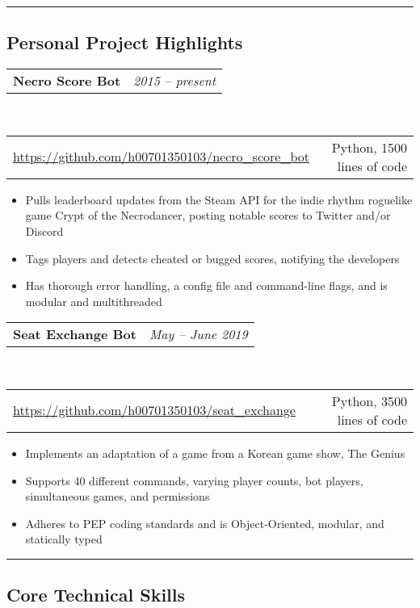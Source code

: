 \documentclass[10pt,letterpaper]{article}
\makeatletter
\newcommand{\headerrow}[2]
{\begin{tabular*}{\linewidth}{l@{\extracolsep{\fill}}r}
	#1 &
	#2 \\
\end{tabular*}}
\makeatother
\begin{document}
\hrule
\vspace{-0.4em}
\subsection*{Personal Project Highlights}


\headerrow
    {\textbf{Necro Score Bot}}
    {\emph{2015 -- present}}
\\
\headerrow
    {\url{https://github.com/h00701350103/necro\_score\_bot}}
    {Python, 1500 lines of code}
\begin{itemize}[noitemsep, topsep=0pt]
    \item Pulls leaderboard updates from the Steam API for the indie rhythm
        roguelike game Crypt of the Necrodancer, posting notable scores to
        Twitter and/or Discord
    \item Tags players and detects cheated or bugged scores, notifying the
        developers
    \item Has thorough error handling, a config file and command-line
        flags, and is modular and multithreaded
\end{itemize}

\vspace{0.5em}
\headerrow
    {\textbf{Seat Exchange Bot}}
    {\emph{May -- June 2019}}
\\
\headerrow
    {\url{https://github.com/h00701350103/seat\_exchange}}
    {Python, 3500 lines of code}
\begin{itemize}[noitemsep, topsep=0pt]
    \item Implements an adaptation of a game from a Korean game show, The
        Genius
    \item Supports 40 different commands, varying player counts,
        bot players, simultaneous games, and permissions
    \item Adheres to PEP coding standards and is Object-Oriented, modular,
        and statically typed
\end{itemize}



\vspace{0.5em}
\hrule
\vspace{-0.4em}
\subsection*{Core Technical Skills}
\end{document}
